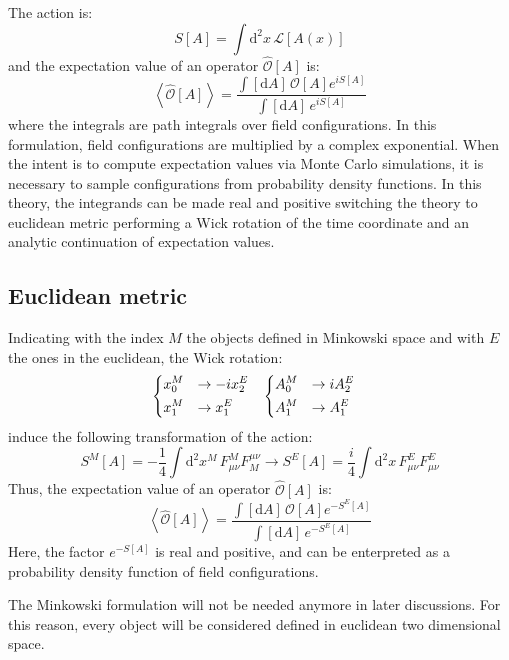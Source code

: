 The action is: \[ S[A] = \int \mathrm d^2x\, \mathcal L[A(x)] \] and the expectation value of an operator $\widehat{\mathcal O}[A]$ is:
\[
    \left< \widehat{\mathcal O}[A] \right> = \frac{\int[\mathrm dA]\, \mathcal O[A] e^{iS[A]}}{\int[\mathrm dA]\,e^{iS[A]}}
\]
where the integrals are path integrals over field configurations.
In this formulation, field configurations are multiplied by a complex exponential.
When the intent is to compute expectation values via Monte Carlo simulations,
it is necessary to sample configurations from probability density functions.
In this theory, the integrands can be made real and positive switching the theory to euclidean metric performing a Wick rotation of the time coordinate and an analytic continuation of expectation values.

\subsection*{Euclidean metric}

Indicating with the index $M$ the objects defined in Minkowski space and with $E$ the ones in the euclidean, the Wick rotation:
\begin{align*}
    &\begin{dcases}
        x^M_0 &\rightarrow -i x^E_2 \\
        x^M_1 &\rightarrow x^E_1
    \end{dcases}%
    &%
    \begin{dcases}
        A^M_0 &\rightarrow i A^E_2 \\
        A^M_1 &\rightarrow A^E_1 
    \end{dcases}&
\end{align*}
induce the following transformation of the action:
\begin{equation}\label{eq:cont_action}
    S^M[A] = -\frac{1}{4}\int\mathrm d^2x^M\,F^M_{\mu\nu}F_M^{\mu\nu} \rightarrow  S^E[A] = \frac{i}{4}\int\mathrm d^2x\,F^E_{\mu\nu}F^E_{\mu\nu}
\end{equation}
Thus, the expectation value of an operator $\widehat{\mathcal O}[A]$ is:
\begin{equation}\label{eq:cont_exp}
    \left< \widehat{\mathcal O}[A] \right> = \frac{\int[\mathrm dA]\, \mathcal O[A] e^{-S^E[A]}}{\int[\mathrm dA]\,e^{-S^E[A]}}
\end{equation}
Here, the factor $e^{-S[A]}$ is real and positive, and can be enterpreted as a probability density function of field configurations.

The Minkowski formulation will not be needed anymore in later discussions.
For this reason, every object will be considered defined in euclidean two dimensional space.

